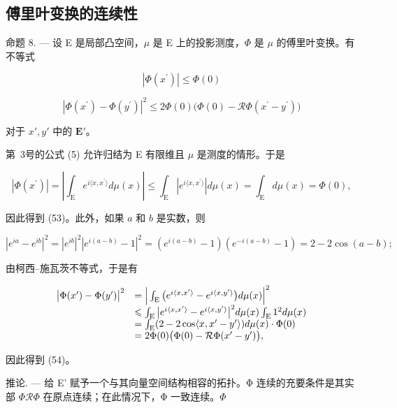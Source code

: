 \subsection{傅里叶变换的连续性}

命题 8. --- 设 E 是局部凸空间，\(\mu\) 是 E 上的投影测度，\(\Phi\) 是 \(\mu\) 的傅里叶变换。有不等式

\[
\left| \Phi (x ^ {\prime}) \right| \leqslant \Phi (0)\tag{53}
\]

\[
\left| \Phi (x ^ {\prime}) - \Phi (y ^ {\prime}) \right| ^ {2} \leqslant 2 \Phi (0) \big (\Phi (0) - \mathcal {R} \Phi (x ^ {\prime} - y ^ {\prime}) \big)\tag{54}
\]

对于 \(x', y'\) 中的 \(\mathbf{E}'\)。

第~3号的公式 (5) 允许归结为 E 有限维且 \(\mu\) 是测度的情形。于是

\[
\left| \Phi (x ^ {\prime}) \right| = \left| \int_ {\mathrm{E}} e ^ {i \langle x, x ^ {\prime} \rangle} d \mu (x) \right| \leqslant \int_ {\mathrm{E}} | e ^ {i \langle x, x ^ {\prime} \rangle} | d \mu (x) = \int_ {\mathrm{E}} d \mu (x) = \Phi (0),
\]

因此得到 (53)。此外，如果 \(a\) 和 \(b\) 是实数，则

\[
\left| e ^ {i a} - e ^ {i b} \right| ^ {2} = \left| e ^ {i b} \right| ^ {2} \left| e ^ {i (a - b)} - 1 \right| ^ {2} = \left(e ^ {i (a - b)} - 1\right) \left(e ^ {- i (a - b)} - 1\right) = 2 - 2 \cos (a - b);
\]

由柯西--施瓦茨不等式，于是有

\[
\begin{array}{r l} \big | \Phi (x ^ {\prime}) - \Phi (y ^ {\prime}) \big | ^ {2} & = \Big | \int_ {\mathrm{E}} \big (e ^ {i \langle x, x ^ {\prime} \rangle} - e ^ {i \langle x, y ^ {\prime} \rangle} \big) d \mu (x) \Big | ^ {2} \\ & \leqslant \int_ {\mathrm{E}} \big | e ^ {i \langle x, x ^ {\prime} \rangle} - e ^ {i \langle x, y ^ {\prime} \rangle} \big | ^ {2} d \mu (x) \int_ {\mathrm{E}} 1 ^ {2} d \mu (x) \\ & = \int_ {\mathrm{E}} (2 - 2 \cos \langle x, x ^ {\prime} - y ^ {\prime} \rangle) d \mu (x) \cdot \Phi (0) \\ & = 2 \Phi (0) \big (\Phi (0) - \mathcal {R} \Phi (x ^ {\prime} - y ^ {\prime}) \big), \end{array}
\]

因此得到 (54)。

推论. --- 给 E' 赋予一个与其向量空间结构相容的拓扑。Φ 连续的充要条件是其实部 \(\Phi\)\(\mathcal{R}\Phi\) 在原点连续；在此情况下，Φ 一致连续。\(\Phi\)

